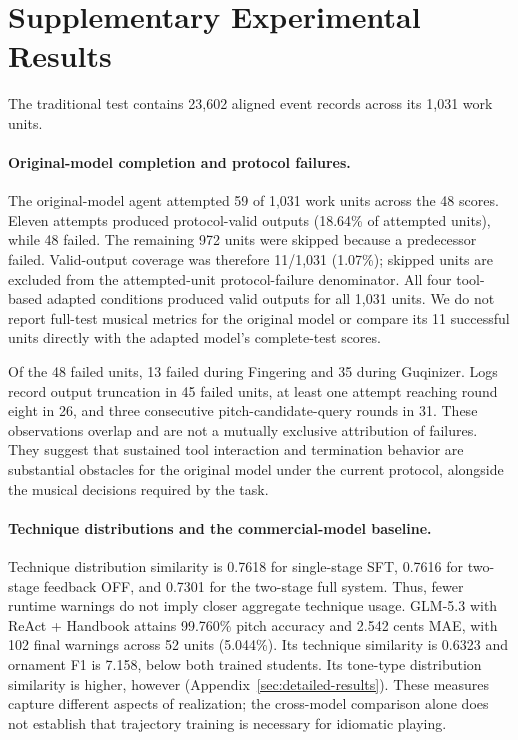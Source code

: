 \section{Supplementary Experimental Results}\label{sec:supplementary-experiments}
The traditional test contains 23,602 aligned event records across its 1,031 work units.
\paragraph{Original-model completion and protocol failures.}
The original-model agent attempted 59 of 1,031 work units across the 48 scores. Eleven attempts produced protocol-valid outputs (18.64\% of attempted units), while 48 failed. The remaining 972 units were skipped because a predecessor failed. Valid-output coverage was therefore 11/1,031 (1.07\%); skipped units are excluded from the attempted-unit protocol-failure denominator. All four tool-based adapted conditions produced valid outputs for all 1,031 units. We do not report full-test musical metrics for the original model or compare its 11 successful units directly with the adapted model's complete-test scores.

Of the 48 failed units, 13 failed during Fingering and 35 during Guqinizer. Logs record output truncation in 45 failed units, at least one attempt reaching round eight in 26, and three consecutive pitch-candidate-query rounds in 31. These observations overlap and are not a mutually exclusive attribution of failures. They suggest that sustained tool interaction and termination behavior are substantial obstacles for the original model under the current protocol, alongside the musical decisions required by the task.

\paragraph{Technique distributions and the commercial-model baseline.}
Technique distribution similarity is 0.7618 for single-stage SFT, 0.7616 for two-stage feedback OFF, and 0.7301 for the two-stage full system. Thus, fewer runtime warnings do not imply closer aggregate technique usage. GLM-5.3 with ReAct + Handbook attains 99.760\% pitch accuracy and 2.542 cents MAE, with 102 final warnings across 52 units (5.044\%). Its technique similarity is 0.6323 and ornament F1 is 7.158, below both trained students. Its tone-type distribution similarity is higher, however (Appendix~\ref{sec:detailed-results}). These measures capture different aspects of realization; the cross-model comparison alone does not establish that trajectory training is necessary for idiomatic playing.

